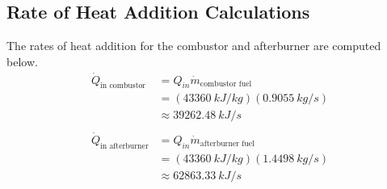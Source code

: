 \documentclass[11pt]{article} %
\begin{document}
\subsection*{Rate of Heat Addition Calculations}
The rates of heat addition for the combustor and afterburner are computed below.
\begin{align*}
\dot{Q}_{\text{in combustor}} &= Q_{in}\dot{m}_{\text{combustor fuel}} \\
&= (43360\ \si{kJ/kg})(0.9055\ \si{kg/s}) \\
&\approx 39262.48\ \si{kJ/s}\\\\
\dot{Q}_{\text{in afterburner}} &= Q_{in}\dot{m}_{\text{afterburner fuel}}\\
&= (43360\ \si{kJ/kg})(1.4498\ \si{kg/s}) \\
&\approx 62863.33\ \si{kJ/s}\\\\
\end{align*}
\end{document}
